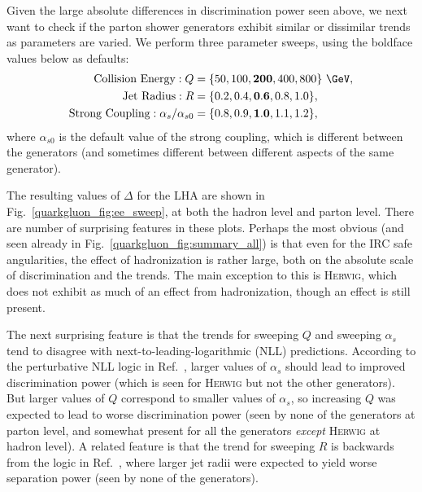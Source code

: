 \documentclass[11pt]{cernrep}
\begin{document}
Given the large absolute differences in discrimination power seen above, we next want to check if the parton shower generators exhibit similar or dissimilar trends as parameters are varied.  We perform three parameter sweeps, using the boldface values below as defaults:
\begin{equation}
\begin{aligned}
\text{Collision Energy}: Q &= \{ 50, 100, \mathbf{200}, 400, 800\}~\GeV, \\
\text{Jet Radius}: R &= \{ 0.2, 0.4, \mathbf{0.6}, 0.8, 1.0\}, \\
\text{Strong Coupling}: \alpha_s / \alpha_{s0} &= \{0.8,0.9,\mathbf{1.0},1.1,1.2\}, \\
\end{aligned}
\end{equation}
where $\alpha_{s0}$ is the default value of the strong coupling, which is different between the generators (and sometimes different between different aspects of the same generator).

The resulting values of $\Delta$ for the LHA are shown in Fig.~\ref{quarkgluon_fig:ee_sweep}, at both the hadron level and parton level.   There are number of surprising features in these plots.  Perhaps the most obvious (and seen already in Fig.~\ref{quarkgluon_fig:summary_all}) is that even for the IRC safe angularities, the effect of hadronization is rather large, both on the absolute scale of discrimination and the trends.  The main exception to this is \textsc{Herwig}, which does not exhibit as much of an effect from hadronization, though an effect is still present.

The next surprising feature is that the trends for sweeping $Q$ and sweeping $\alpha_s$ tend to disagree with next-to-leading-logarithmic (NLL) predictions.  According to the  perturbative NLL logic in Ref.~\cite{Larkoski:2013eya}, larger values of $\alpha_s$ should lead to improved discrimination power (which is seen for \textsc{Herwig} but not the other generators).  But larger values of $Q$ correspond to smaller values of $\alpha_s$, so increasing $Q$ was expected to lead to worse discrimination power (seen by none of the generators at parton level, and somewhat present for all the generators \emph{except} \textsc{Herwig} at hadron level).  A related feature is that the trend for sweeping $R$ is backwards from the logic in Ref.~\cite{Larkoski:2013eya}, where larger jet radii were expected to yield worse separation power (seen by none of the generators).
\end{document}
